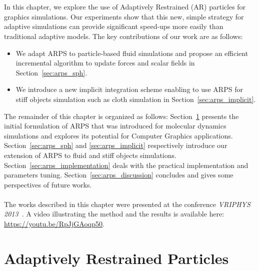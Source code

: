 \\ \\
In this chapter, we explore the use of Adaptively Restrained (AR) particles for graphics simulations. Our experiments show that this new, simple strategy for adaptive simulations can provide significant speed-ups more easily than traditional adaptive models. The key contributions of our work are as follows: 
\begin{itemize}
\item We adapt ARPS to particle-based fluid simulations and propose an efficient incremental algorithm to update forces and scalar fields in Section~\ref{sec:arps_sph}.
\item We introduce a new implicit integration scheme enabling to use ARPS for stiff objects simulation such as cloth simulation in Section~\ref{sec:arps_implicit}.
\end{itemize}

The remainder of this chapter is organized as follows: 
Section~\ref{sec:arps_basics} presents the initial formulation of ARPS that was introduced for molecular dynamics simulations and explores its potential for Computer Graphics applications. 
Section~\ref{sec:arps_sph} and \ref{sec:arps_implicit} respectively introduce our extension of ARPS to fluid and stiff objects simulations. 
Section~\ref{sec:arps_implementation} deals with the practical implementation and parameters tuning. 
Section~\ref{sec:arps_discussion} concludes and gives some perspectives of future works.
\\ \\
The works described in this chapter were presented at the conference \emph{VRIPHYS 2013}~\cite{Manteaux2013}. A video illustrating the method and the results is available here: \url{https://youtu.be/RpJjGAoqp50}.
\section{Adaptively Restrained Particles} 
\label{sec:arps_basics}

